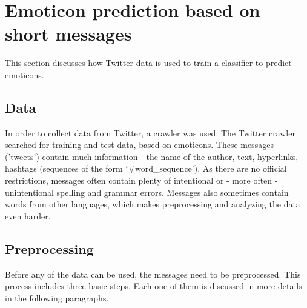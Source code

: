 \documentclass{article} %
\begin{document}
\section{Emoticon prediction based on short messages}

\begin{comment}
Approach (roughly 2-3 pages)
• Explain the model; if any important assumptions are made at this stage, explain why they are
reasonable or necessary
• Explain learning / inference algorithms
• Explaining (perhaps briefly) any necessary preprocessing / postprocesing / data acquisition stages
(maybe earlier, depending on the project; may also move to the experimental section)
\end{comment}


This section discusses how Twitter data is used to train a classifier to predict emoticons. 

\subsection{Data}

In order to collect data from Twitter, a crawler was used. The Twitter crawler searched for training and test data, based on emoticons. These messages ('tweets') contain much information - the name of the author, text, hyperlinks, hashtags (sequences of the form `\#word\_sequence'). As there are no official restrictions, messages often contain plenty of intentional or - more often - unintentional spelling and grammar errors. Messages also sometimes contain words from other languages, which makes preprocessing and analyzing the data even harder.


\subsection{Preprocessing \label{sec:preprocessing}}

Before any of the data can be used, the messages need to be preprocessed. This process includes three basic steps. Each one of them is discussed in more details in the following paragraphs.



\begin{comment}
\begin{itemize}
\item \textbf{Splitting the message} into different components - text, hashtags and emoticons.
\item \textbf{Spelling check and correction} 
\item \textbf{Grammar check and correction} 
\end{itemize}
\end{comment}
\end{document}
